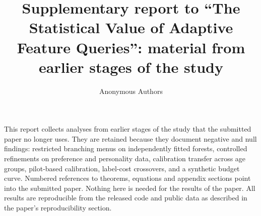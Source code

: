\documentclass{article}
\title{Supplementary report to ``The Statistical Value of Adaptive Feature Queries'': material from earlier stages of the study}
\author{Anonymous Authors}
\date{}
\begin{document}
\maketitle
\noindent This report collects analyses from earlier stages of the study that the submitted paper no longer uses. They are retained because they document negative and null findings: restricted branching menus on independently fitted forests, controlled refinements on preference and personality data, calibration transfer across age groups, pilot-based calibration, label-cost crossovers, and a synthetic budget curve. Numbered references to theorems, equations and appendix sections point into the submitted paper. Nothing here is needed for the results of the paper. All results are reproducible from the released code and public data as described in the paper's reproducibility section.
\renewcommand{\thesection}{S\arabic{section}}










\end{document}
